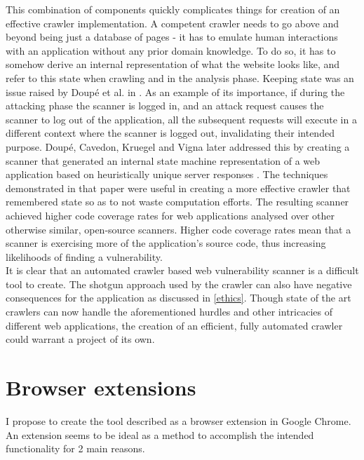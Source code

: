 This combination of components quickly complicates things for creation of an effective crawler implementation. A competent crawler needs to go above and beyond being just a database of pages - it has to emulate human interactions with an application without any prior domain knowledge. To do so, it has to somehow derive an internal representation of what the website looks like, and refer to this state when crawling and in the analysis phase. Keeping state was an issue raised by Doup\'e et al. in \cite{whyJohnnyCantPentest}. As an example of its importance, if during the attacking phase the scanner is logged in, and an attack request causes the scanner to log out of the application, all the subsequent requests will execute in a different context where the scanner is logged out, invalidating their intended purpose. Doup\'e, Cavedon, Kruegel and Vigna later addressed this by creating a scanner that generated an internal state machine representation of a web application based on heuristically unique server responses \cite{stateAwareBlackBoxWebVulnScanner}. The techniques demonstrated in that paper were useful in creating a more effective crawler that remembered state so as to not waste computation efforts. The resulting scanner achieved higher code coverage rates for web applications analysed over other otherwise similar, open-source scanners. Higher code coverage rates mean that a scanner is exercising more of the application's source code, thus increasing likelihoods of finding a vulnerability. \\

It is clear that an automated crawler based web vulnerability scanner is a difficult tool to create. The shotgun approach used by the crawler can also have negative consequences for the application as discussed in \ref{ethics}. Though state of the art crawlers can now handle the aforementioned hurdles and other intricacies of different web applications, the creation of an efficient, fully automated crawler could warrant a project of its own. \\

 
\section{Browser extensions}

I propose to create the tool described as a browser extension in Google Chrome. An extension seems to be ideal as a method to accomplish the intended functionality for 2 main reasons.

